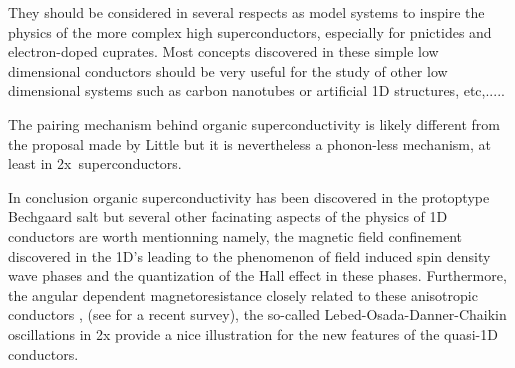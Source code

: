 \documentclass[11pt]{article} %
\begin{document}
They should be considered in several respects as model systems to inspire the physics of the more complex high \tc superconductors, especially for  pnictides and electron-doped cuprates. Most concepts discovered in these simple low dimensional conductors should be very useful for the study of other low dimensional systems such as carbon nanotubes or artificial 1D structures, etc,.....

The pairing mechanism behind organic superconductivity is likely different from the proposal made by Little but it is nevertheless a phonon-less mechanism, at least in \tm2x \,superconductors.

In conclusion %
organic superconductivity  has been discovered in the protoptype Bechgaard salt  but  several  other facinating aspects of the physics of 1D conductors are worth mentionning namely, the  magnetic field
confinement discovered in the 1D's leading to the phenomenon of field induced spin density wave phases\cite{Ribault83,Chaikin83,Gorkov84} and  the quantization of the Hall effect in these phases\cite{Cooper89,Hannahs89,Heritier84}. Furthermore, the  angular dependent magnetoresistance  closely related to these anisotropic conductors \cite{Osada91,Naughton91}, (see \cite{Osada06} for a recent survey), the so-called Lebed-Osada-Danner-Chaikin oscillations in \tms2x provide a nice illustration for the new features of the quasi-1D conductors\cite{Lebed86a}. 



\end{document}
